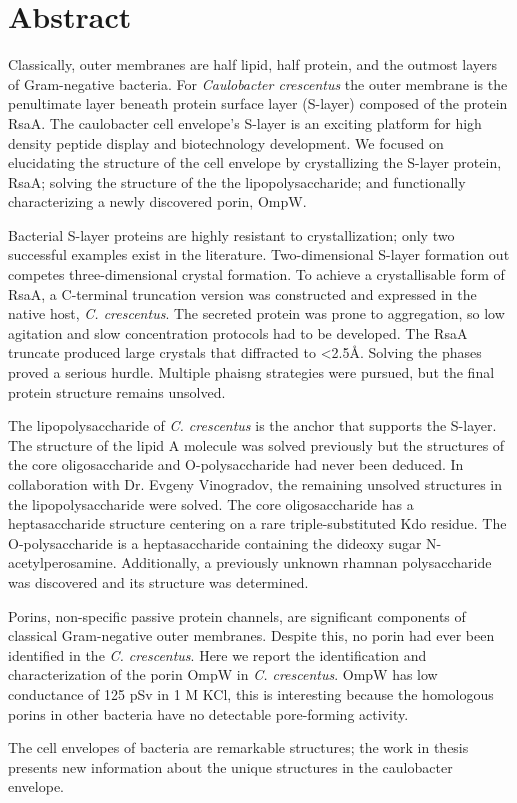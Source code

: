 
\chapter{Abstract}

Classically, outer membranes are half lipid, half protein, and the outmost layers of Gram-negative bacteria. For \textit{Caulobacter crescentus} the outer membrane is the penultimate layer beneath protein surface layer (S-layer) composed of the protein RsaA. The caulobacter cell envelope’s S-layer is an exciting platform for high density peptide display and biotechnology development. We focused on elucidating the structure of the cell envelope by crystallizing the S-layer protein, RsaA; solving the structure of the the lipopolysaccharide; and functionally characterizing a newly discovered porin, OmpW. 

Bacterial S-layer proteins are highly resistant to crystallization; only two successful examples exist in the literature. Two-dimensional S-layer formation out competes three-dimensional crystal formation. To achieve a crystallisable form of RsaA, a C-terminal truncation version was constructed and expressed in the native host, \textit{C. crescentus}. The secreted protein was prone to aggregation, so low agitation and slow concentration protocols had to be developed. The RsaA truncate produced large crystals that diffracted to <2.5\AA. Solving the phases proved a serious hurdle. Multiple phaisng strategies were pursued, but the final protein structure remains unsolved.

The lipopolysaccharide of \textit{C. crescentus} is the anchor that supports the S-layer. The structure of the lipid A molecule was solved previously but the structures of the core oligosaccharide and O-polysaccharide had never been deduced. In collaboration with Dr. Evgeny Vinogradov, the remaining unsolved structures in the lipopolysaccharide were solved. The core oligosaccharide has a heptasaccharide structure centering on a rare triple-substituted Kdo residue. The O-polysaccharide is a heptasaccharide containing the dideoxy sugar N-acetylperosamine. Additionally, a previously unknown rhamnan polysaccharide was discovered and its structure was determined. 

Porins, non-specific passive protein channels, are significant components of classical Gram-negative outer membranes. Despite this, no porin had ever been identified in the \textit{C. crescentus}. Here we report the identification and characterization of the porin OmpW in \textit{C. crescentus}.  OmpW has low conductance of 125 pSv in 1 M KCl, this is interesting because the homologous porins in other bacteria have no detectable pore-forming activity.

The cell envelopes of bacteria are remarkable structures; the work in thesis presents new information about the unique structures in the caulobacter envelope. 
